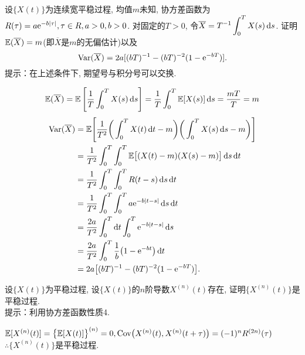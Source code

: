 \begin{problem}{4.12}
设$\{X(t)\}$为连续宽平稳过程, 均值$m$未知, 协方差函数为$R(\tau) = a\mathrm{e}^{-b|\tau|}, \tau \in R, a > 0, b > 0$. 对固定的$T > 0$, 令$\displaystyle \overline{X} = T^{-1}\int^T_0 X(s)\mathop{}\!\mathrm{d} s$. 证明$\mathbb{E}(\overline{X}) = m$(即$\overline{X}$是$m$的无偏估计)以及
\[\mathrm{Var}(\overline{X}) = 2a[(bT)^{-1}-(bT)^{-2}(1-\mathrm{e}^{-bT})].\]
提示：在上述条件下, 期望号与积分号可以交换.
\end{problem}
\begin{solution}
	\[\mathbb{E}(\overline{X}) = \mathbb{E}\left[\frac{1}{T}\int^T_0X(s)\mathop{}\!\mathrm{d} s\right] = \frac{1}{T}\int^T_0\mathbb{E}[X(s)]\mathop{}\!\mathrm{d} s = \frac{mT}{T} = m\]
	\[
		\begin{split}
			\var(\overline{X}) & = \E\Bigg[\frac{1}{T^2}\bigg(\int^T_0 X(t)\d t - m\bigg)\bigg(\int^T_0 X(s)\d s - m\bigg)\Bigg]\\
			& = \frac{1}{T^2}\int^T_0\int^T_0 \E\big[(X(t)-m)(X(s)-m)\big]\d s \d t\\
			& = \frac{1}{T^2}\int^T_0\int^T_0 R(t-s)\d s \d t\\
			& = \frac{1}{T^2}\int^T_0\int^T_0 a\e^{-b|t-s|}\d s \d t\\
			& = \frac{2a}{T^2}\int^T_0\d t\int^T_0 \e^{-b|t-s|}\d s\\
			& = \frac{2a}{T^2}\int^T_0\frac{1}{b}\big(1-\e^{-bt}\big)\d t\\
			& = 2a\big[(bT)^{-1}-(bT)^{-2}(1-\e^{-bT})\big].
		\end{split}
	\]
\end{solution}

\begin{problem}{4.13}
设$\{X(t)\}$为平稳过程, 设$\{X(t)\}$的$n$阶导数$X^{(n)}(t)$存在, 证明$\{X^{(n)}(t)\}$是平稳过程.\\
提示：利用协方差函数性质4.
\end{problem}
\begin{solution}
	$\mathbb{E}[X^{(n)}(t)] = \big\{\mathbb{E}[X(t)]\big\}^{(n)} = 0, \mathrm{Cov}\big(X^{(n)}(t), X^{(n)}(t+\tau)\big) = (-1)^n R^{(2n)}(\tau)$\\
	$\therefore \{X^{(n)}(t)\}$是平稳过程.
\end{solution}

